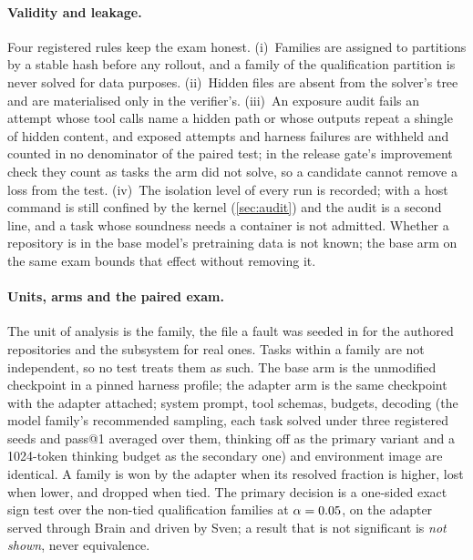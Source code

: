 \paragraph{Validity and leakage.} Four registered rules keep the exam honest. (i)~Families are
assigned to partitions by a stable hash before any rollout, and a family of the qualification
partition is never solved for data purposes. (ii)~Hidden files are absent from the
solver's tree and are materialised only in the verifier's. (iii)~An exposure audit fails
an attempt whose tool calls name a hidden path or whose outputs repeat a shingle of hidden
content, and exposed attempts and harness failures are withheld and counted in no
denominator of the paired test; in the release gate's improvement check they count as tasks
the arm did not solve, so a candidate cannot remove a loss from the test. (iv)~The isolation level of every run is recorded; with
 a host command is still confined by the kernel (\cref{sec:audit}) and the audit
is a second line, and a task whose soundness needs a container is not admitted. Whether a repository is in the base model's
pretraining data is not known; the base arm on the same exam bounds that effect without
removing it.

\paragraph{Units, arms and the paired exam.} The unit of analysis is the family, the file a
fault was seeded in for the authored repositories and the subsystem for real
ones. Tasks within a family are not independent, so no test treats them as such. The
base arm is the unmodified checkpoint in a pinned harness profile; the adapter arm is the same
checkpoint with the adapter attached; system prompt, tool schemas, budgets, decoding (the model family's recommended sampling, each task solved under three registered seeds and pass@1 averaged over them, thinking off as the primary variant and a 1024-token thinking budget as the secondary one) and environment image are identical. A family is won by the adapter
when its resolved fraction is higher, lost when lower, and dropped when tied. The primary
decision is a one-sided exact sign test over the non-tied qualification families at
$\alpha=0.05$, on the adapter served through Brain and driven by Sven; a result that is
not significant is \emph{not shown}, never equivalence.

